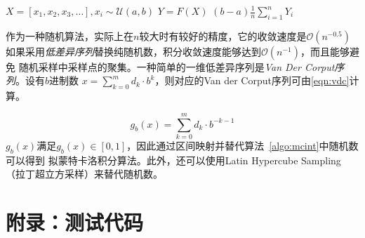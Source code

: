 \documentclass[a4paper,twoside]{article}
\begin{document}
\begin{spacing}{1.2}
\begin{algorithm}
\begin{algorithmic}[1]
		\State $X=[x_1,x_2,x_3,\ldots], x_i \sim\mathcal{U}(a,b)$
		\State $Y=F(X)$
		\State \Return $(b-a)\frac{1}{n}\sum_{i=1}^nY_i$
		\EndProcedure
	\end{algorithmic}
\end{algorithm}	

作为一种随机算法，实际上在$n$较大时有较好的精度，它的收敛速度是$\mathcal{O}(n^{-0.5})$
如果采用\emph{低差异序列}替换纯随机数，积分收敛速度能够达到$\mathcal{O}(n^{-1})$，而且能够避免
随机采样中采样点的聚集。一种简单的一维低差异序列是\emph{Van Der Corput序列}。设有$b$进制数
$x=\sum_{k=0}^md_k\cdot b^k$，则对应的Van der Corput序列可由\eqref{eqn:vdc}计算。

\begin{equation}
	\label{eqn:vdc}
	g_b(x)=\sum_{k=0}^{m}d_k\cdot b^{-k-1}
\end{equation}
$g_b(x)$满足$g_b(x)\in [0,1]$，因此通过区间映射并替代算法~\ref{algo:mcint}中随机数可以得到
拟蒙特卡洛积分算法。此外，还可以使用Latin Hypercube Sampling（拉丁超立方采样）来替代随机数。

\clearpage

\section{附录：测试代码}
\label{sec:app_code}
\end{spacing}
\end{document}
